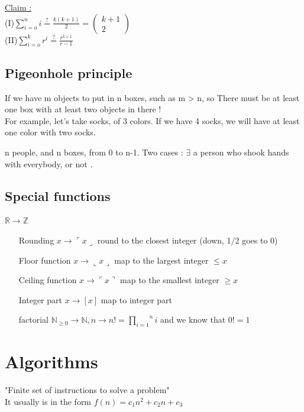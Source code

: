 \documentclass[12pt,a4paper]{article}
\begin{document}
\underline{Claim :} \\
(I)$\sum_{i=o}^{n} i \overset{?}{=} \frac{k(k+1)}{2} = \begin{pmatrix}
k+1\\
2
\end{pmatrix}$\\
(II)$\sum_{i=o}^{k} r^i \overset{?}{=} \frac{r^{k+1}}{r-1}$

\subsection*{Pigeonhole principle}

If we have m objects to put in n boxes, such as m > n, so There must be at least one box with at least two objects in there !\\
For example, let's take socks, of 3 colors. If we have 4 socks, we will have at least one color with two socks. 

n people, and n boxes, from 0 to n-1. Two cases : $\exists$ a person who shook hands with everybody, or not
.
\subsection*{Special functions}
$\mathbb{R}\rightarrow \mathbb{Z}$
\begin{itemize}
\item[Rounding] $x \rightarrow \ulcorner x\lrcorner$ round to the closest integer (down, 1/2 goes to 0)
\item[Floor function] $x \rightarrow \llcorner x \lrcorner$ map to the largest integer $\leq x$
\item[Ceiling function]$x \rightarrow \ulcorner x\urcorner$ map to the smallest integer $\geq x$
\item[Integer part]$x \rightarrow [x]$ map to integer part
\item[factorial] $\mathbb{N}_{\geq 0} \rightarrow \mathbb{N}, n \rightarrow n! = \overset{n}{\underset{i = 1}{\prod}}i$ and we know that $0! = 1$
\end{itemize}

\section{Algorithms}
\begin{boiteV}{0.9}
\Definition "Finite set of instructions to solve a problem"\\
It usually is in the form $f(n) = c_1n^2+c_2n+c_3$
\end{boiteV}
\end{document}
